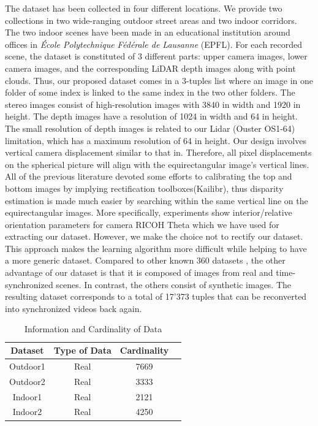\documentclass[english, LaM, oneside]{sapthesis}%
\begin{document}
The dataset has been collected in four different locations. We provide two collections in two wide-ranging outdoor street areas and two indoor corridors. The two indoor scenes have been made in an educational institution around offices in \textit{École Polytechnique Fédérale de Lausanne} (EPFL). 
For each recorded scene, the dataset is constituted of 3 different parts: upper camera images, lower camera images, and the corresponding LiDAR depth images along with point clouds.
Thus, our proposed dataset comes in a 3-tuples list where an image in one folder of some index is linked to the same index in the two other folders. 
The stereo images consist of high-resolution images with 3840 in width and 1920 in height. The depth images have a resolution of 1024 in width and 64 in height. The small resolution of depth images is related to our Lidar (Ouster OS1-64) limitation, which has a maximum resolution of 64 in height\cite{ref:ouster}.
Our design involves vertical camera displacement similar to that in\cite{c18, c19, c20}. Therefore, all pixel displacements on the spherical picture will align with the equirectangular image's vertical lines. All of the previous literature devoted some efforts to calibrating the top and bottom images by implying rectification toolboxes(Kailibr), thus disparity estimation is made much easier by searching within the same vertical line on the equirectangular images. More specifically, \cite{c21} experiments show interior/relative orientation parameters for camera RICOH Theta which we have used for extracting our dataset. However, we make the choice not to rectify our dataset. This approach makes the learning algorithm more difficult while helping to have a more generic dataset. Compared to other known 360 datasets \cite{c23}, the other advantage of our dataset is that it is composed of images from real and time-synchronized scenes. In contrast, the others consist of synthetic images. The resulting dataset corresponds to a total of 17'373 tuples that can be reconverted into synchronized videos back again.

\begin{table}[!h]
\caption{Information and Cardinality of Data}
\label{table_example}
\begin{center}
\begin{tabular}{|c||c||c||c|}
\hline
Dataset & Type of Data & Cardinality\\
\hline
Outdoor1 & Real & 7669\\
\hline
Outdoor2 & Real & 3333\\
\hline
Indoor1 & Real & 2121 \\
\hline
Indoor2 & Real & 4250 \\
\hline
\end{tabular}
\end{center}
\end{table}
\end{document}
